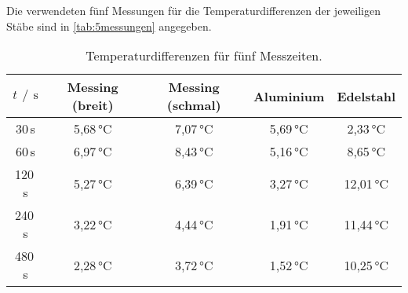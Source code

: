 Die verwendeten fünf Messungen für die Temperaturdifferenzen der jeweiligen Stäbe sind in \autoref{tab:5messungen} angegeben.
\begin{table}[h]
  \centering
  \caption{Temperaturdifferenzen für fünf Messzeiten.}
  \label{tab:5messungen}
  \begin{tabular}{c c c c c}
    \toprule
    $t\,\mathbin{/}\,\si{\second}$ & Messing (breit) & Messing (schmal) & Aluminium & Edelstahl \\
    \midrule
     30\,\si{\second} & 5,68\,\si{\celsius} & 7,07\,\si{\celsius} & 5,69\,\si{\celsius} & 2,33\,\si{\celsius} \\
     60\,\si{\second} & 6,97\,\si{\celsius} & 8,43\,\si{\celsius} & 5,16\,\si{\celsius} & 8,65\,\si{\celsius} \\
    120\,\si{\second} & 5,27\,\si{\celsius} & 6,39\,\si{\celsius} & 3,27\,\si{\celsius} & 12,01\,\si{\celsius} \\
    240\,\si{\second} & 3,22\,\si{\celsius} & 4,44\,\si{\celsius} & 1,91\,\si{\celsius} & 11,44\,\si{\celsius} \\
    480\,\si{\second} & 2,28\,\si{\celsius} & 3,72\,\si{\celsius} & 1,52\,\si{\celsius} & 10,25\,\si{\celsius} \\
    \bottomrule
  \end{tabular}
\end{table}

